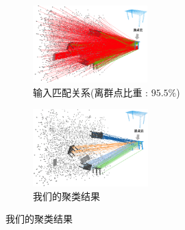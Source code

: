 \begin{figure}[ht]
    \centering
    \begin{subfigure}{0.4\textwidth}
        \centering
        \includegraphics[height=3cm]{images/multi-input-corrs.png}
          \caption{输入匹配关系(离群点比重 : $95.5\%$) }
          \label{fig:multi-corrs}
      \end{subfigure}
      \begin{subfigure}{0.45\textwidth}
        \centering
        \includegraphics[height=3cm]{images/multi-cluster-corrs.png}
          \caption{我们的聚类结果}
          \label{fig:multi-cluster-corrs}
      \end{subfigure}
  

\end{figure}
